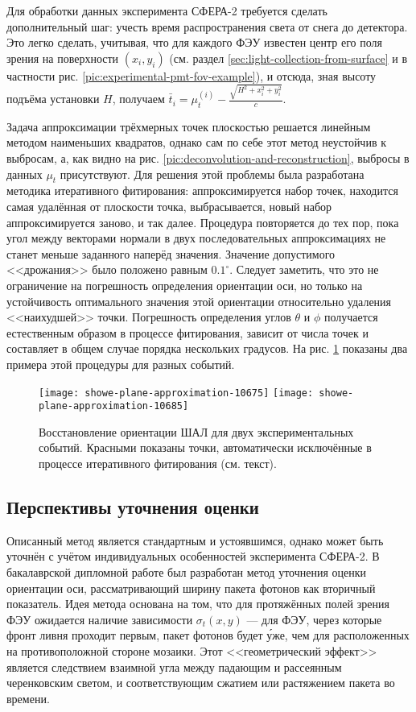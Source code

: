 Для обработки данных эксперимента СФЕРА-2 требуется сделать дополнительный шаг: учесть время распространения света от снега до детектора. Это легко сделать, учитывая, что для каждого ФЭУ известен центр его поля зрения на поверхности $(x_i, y_i)$ (см. раздел \ref{sec:light-collection-from-surface} и в частности рис. \ref{pic:experimental-pmt-fov-example}), и отсюда, зная высоту подъёма установки $H$, получаем $\bar{t}_{i} = \mu_t^{(i)} - \frac{\sqrt{H^2 + x_i^2 + y_i^2}}{c}$.

Задача аппроксимации трёхмерных точек плоскостью решается линейным методом наименьших квадратов, однако сам по себе этот метод неустойчив к выбросам, а, как видно на рис. \ref{pic:deconvolution-and-reconstruction}, выбросы в данных $\mu_t$ присутствуют. Для решения этой проблемы была разработана методика итеративного фитирования: аппроксимируется набор точек, находится самая удалённая от плоскости точка, выбрасывается, новый набор аппроксимируется заново, и так далее. Процедура повторяется до тех пор, пока угол между векторами нормали в двух последовательных аппроксимациях не станет меньше заданного наперёд значения. Значение допустимого <<дрожания>> было положено равным $0.1^{\circ}$. Следует заметить, что это не ограничение на погрешность определения ориентации оси, но только на устойчивость оптимального значения этой ориентации относительно удаления <<наихудшей>> точки. Погрешность определения углов $\theta$ и $\phi$ получается естественным образом в процессе фитирования, зависит от числа точек и составляет в общем случае порядка нескольких градусов. На рис. \ref{pic:plane-reconstruction} показаны два примера этой процедуры для разных событий.


\begin{figure}
	\centering
	\texttt{[image: showe-plane-approximation-10675]}
	\hfill
	\texttt{[image: showe-plane-approximation-10685]}
	\caption{Восстановление ориентации ШАЛ для двух экспериментальных событий. Красными показаны точки, автоматически исключённые в процессе итеративного фитирования (см. текст).}
	\label{pic:plane-reconstruction}
\end{figure}

\subsection{Перспективы уточнения оценки}

Описанный метод является стандартным и устоявшимся, однако может быть уточнён с учётом индивидуальных особенностей эксперимента СФЕРА-2. В бакалаврской дипломной работе \cite{bachelorsthesis} был разработан метод уточнения оценки ориентации оси, рассматривающий ширину пакета фотонов как вторичный показатель. Идея метода основана на том, что для протяжённых полей зрения ФЭУ ожидается наличие зависимости $\sigma_t(x, y)$ --- для ФЭУ, через которые фронт ливня проходит первым, пакет фотонов будет \'{у}же, чем для расположенных на противоположной стороне мозаики. Этот <<геометрический эффект>> является следствием взаимной угла между падающим и рассеянным черенковским светом, и соответствующим сжатием или растяжением пакета во времени.

